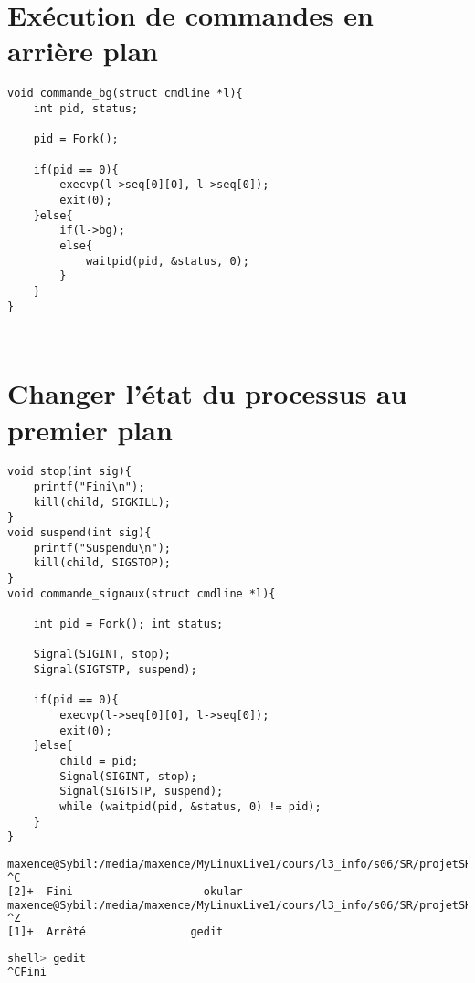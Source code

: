 \documentclass{report}
\begin{document}
		\section{Ex\'ecution de commandes en arri\`ere plan}
			\begin{lstlisting}
void commande_bg(struct cmdline *l){
	int pid, status;

	pid = Fork();

	if(pid == 0){
		execvp(l->seq[0][0], l->seq[0]);
		exit(0);
	}else{
		if(l->bg);
		else{
			waitpid(pid, &status, 0);
		}
	}
}
			\end{lstlisting}
			\begin{lstlisting}[frame=single,basicstyle=\footnotesize,language=bash]
			\end{lstlisting}
			\begin{lstlisting}[frame=single,basicstyle=\footnotesize,language=bash]
			\end{lstlisting}
		\section{Changer l'\'etat du processus au premier plan}
			\begin{lstlisting}
void stop(int sig){
	printf("Fini\n");
	kill(child, SIGKILL);
}
void suspend(int sig){
	printf("Suspendu\n");
	kill(child, SIGSTOP);
}
void commande_signaux(struct cmdline *l){

	int pid = Fork(); int status;

	Signal(SIGINT, stop);	
	Signal(SIGTSTP, suspend);

	if(pid == 0){
		execvp(l->seq[0][0], l->seq[0]);
		exit(0);
	}else{
		child = pid;
		Signal(SIGINT, stop);
		Signal(SIGTSTP, suspend);
		while (waitpid(pid, &status, 0) != pid);
	}
}
			\end{lstlisting}
			\begin{lstlisting}[frame=single,basicstyle=\footnotesize,language=bash]
maxence@Sybil:/media/maxence/MyLinuxLive1/cours/l3_info/s06/SR/projetSHELL$ gedit 
^C
[2]+  Fini                    okular
maxence@Sybil:/media/maxence/MyLinuxLive1/cours/l3_info/s06/SR/projetSHELL$ gedit 
^Z
[1]+  Arrêté                gedit

			\end{lstlisting}
			\begin{lstlisting}[frame=single,basicstyle=\footnotesize,language=bash]
shell> gedit
^CFini

			\end{lstlisting}
\end{document}
